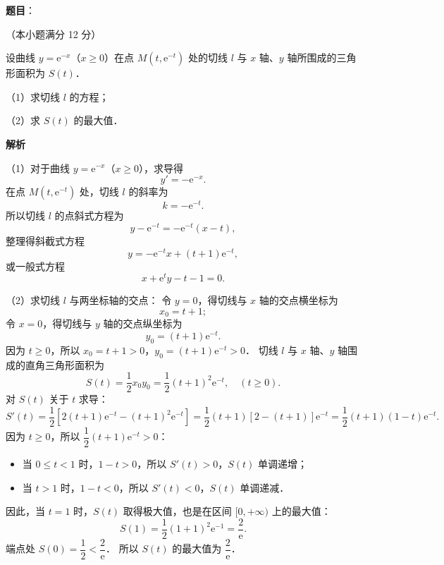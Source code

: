 \begin{answer}

\textbf{题目}：

（本小题满分 12 分）

设曲线 $y = \mathrm{e}^{-x}$（$x \geqslant 0$）在点 $M(t, \mathrm{e}^{-t})$ 处的切线 $l$ 与 $x$ 轴、$y$ 轴所围成的三角形面积为 $S(t)$．

（1）求切线 $l$ 的方程；

（2）求 $S(t)$ 的最大值．

\textbf{解析}

（1）对于曲线 $y = \mathrm{e}^{-x}$（$x \geqslant 0$），求导得
\nopagebreak[4]
\[
y' = -\mathrm{e}^{-x}.
\]
在点 $M(t, \mathrm{e}^{-t})$ 处，切线 $l$ 的斜率为
\nopagebreak[4]
\[
k = -\mathrm{e}^{-t}.
\]
所以切线 $l$ 的点斜式方程为
\nopagebreak[4]
\[
y - \mathrm{e}^{-t} = -\mathrm{e}^{-t}(x - t),
\]
整理得斜截式方程
\nopagebreak[4]
\[
y = -\mathrm{e}^{-t}x + (t + 1)\mathrm{e}^{-t},
\]
或一般式方程
\nopagebreak[4]
\[
x + \mathrm{e}^t y - t - 1 = 0.
\]

（2）求切线 $l$ 与两坐标轴的交点：
令 $y = 0$，得切线与 $x$ 轴的交点横坐标为
\nopagebreak[4]
\[
x_0 = t + 1;
\]
令 $x = 0$，得切线与 $y$ 轴的交点纵坐标为
\nopagebreak[4]
\[
y_0 = (t + 1)\mathrm{e}^{-t}.
\]
因为 $t \geqslant 0$，所以 $x_0 = t + 1 > 0$，$y_0 = (t + 1)\mathrm{e}^{-t} > 0$．
切线 $l$ 与 $x$ 轴、$y$ 轴围成的直角三角形面积为
\nopagebreak[4]
\[
S(t) = \frac{1}{2} x_0 y_0 = \frac{1}{2}(t + 1)^2 \mathrm{e}^{-t}, \quad (t \geqslant 0).
\]
对 $S(t)$ 关于 $t$ 求导：
\nopagebreak[4]
\[
S'(t) = \frac{1}{2} \left[ 2(t + 1)\mathrm{e}^{-t} - (t + 1)^2 \mathrm{e}^{-t} \right] = \frac{1}{2}(t + 1)[2 - (t + 1)]\mathrm{e}^{-t} = \frac{1}{2}(t + 1)(1 - t)\mathrm{e}^{-t}.
\]
因为 $t \geqslant 0$，所以 $\dfrac{1}{2}(t + 1)\mathrm{e}^{-t} > 0$：
\begin{itemize}
\item 当 $0 \leqslant t < 1$ 时，$1 - t > 0$，所以 $S'(t) > 0$，$S(t)$ 单调递增；
\item 当 $t > 1$ 时，$1 - t < 0$，所以 $S'(t) < 0$，$S(t)$ 单调递减．
\end{itemize}
因此，当 $t = 1$ 时，$S(t)$ 取得极大值，也是在区间 $[0, +\infty)$ 上的最大值：
\nopagebreak[4]
\[
S(1) = \frac{1}{2}(1 + 1)^2 \mathrm{e}^{-1} = \frac{2}{\mathrm{e}}.
\]
端点处 $S(0) = \dfrac{1}{2} < \dfrac{2}{\mathrm{e}}$．
所以 $S(t)$ 的最大值为 $\dfrac{2}{\mathrm{e}}$．


\end{answer}
